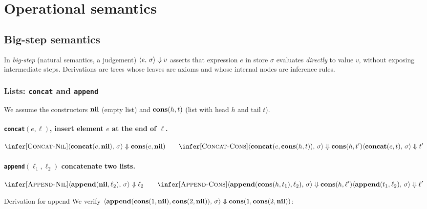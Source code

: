 \section{Operational semantics}

\subsection{Big-step semantics}
In \emph{big-step} (natural semantics, a judgement) $\langle e,\, \sigma \rangle \Downarrow v$ asserts that expression $e$ in store $\sigma$ evaluates \emph{directly} to value $v$, without exposing intermediate steps. Derivations are trees whose leaves are axioms and whose internal nodes are inference rules.

\subsubsection{Lists: \texttt{concat} and \texttt{append}}

We assume the constructors $\mathbf{nil}$ (empty list) and $\mathbf{cons}(h,t)$ (list with
head $h$ and tail $t$).

\paragraph{\texttt{concat}$(e,\ell)$, insert element $e$ at the end of $\ell$.}

\[
\infer[\textsc{Concat-Nil}]
  {\bigstep{\concat{e}{\nil}}{\sigma}{\cons{e}{\nil}}}
  {}
\qquad
\infer[\textsc{Concat-Cons}]
  {\bigstep{\concat{e}{\cons{h}{t}}}{\sigma}{\cons{h}{t'}}}
  {\bigstep{\concat{e}{t}}{\sigma}{t'}}
\]

\paragraph{\texttt{append}$(\ell_1, \ell_2)$ concatenate two lists.}

\[
\infer[\textsc{Append-Nil}]
  {\bigstep{\append{\nil}{\ell_2}}{\sigma}{\ell_2}}
  {}
\qquad
\infer[\textsc{Append-Cons}]
  {\bigstep{\append{\cons{h}{t_1}}{\ell_2}}{\sigma}{\cons{h}{\ell'}}}
  {\bigstep{\append{t_1}{\ell_2}}{\sigma}{\ell'}}
\]

Derivation for append
We verify $\langle \mathbf{append}(\mathbf{cons}(1,\mathbf{nil}),\mathbf{cons}(2,\mathbf{nil})),\, \sigma \rangle \Downarrow \mathbf{cons}(1,\mathbf{cons}(2,\mathbf{nil}))$:

